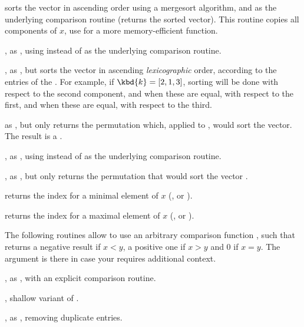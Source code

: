 
 sorts the vector  in ascending order using a
mergesort algorithm, and  as the underlying comparison routine
(returns the sorted vector). This routine copies all components of $x$, use
 for a more memory-efficient function.

, as , using  instead of
 as the underlying comparison routine.

, as , but sorts the
vector  in ascending \emph{lexicographic} order, according to the
entries of the  . For example,  if $\kbd{k} = [2,1,3]$,
sorting will be done with respect to the second component,  and when these
are  equal, with respect to the first,  and when these are equal,  with
respect to the third.


 as , but only returns the permutation
which, applied to , would sort the vector. The result is a
.

, as , using 
instead of  as the underlying comparison routine.

, as , but only
returns the permutation that would sort the vector .

 returns the index for a minimal element of $x$
(,  or ).

 returns the index for a maximal element of $x$
(,  or ).

 The following routines allow to use an
arbitrary comparison function ,
such that  returns a negative result if $x
< y$, a positive one if $x > y$ and 0 if $x = y$. The  argument is
there in case your  requires additional context.

, as
, with an explicit comparison routine.

,
shallow variant of .

, as
, removing duplicate entries.

